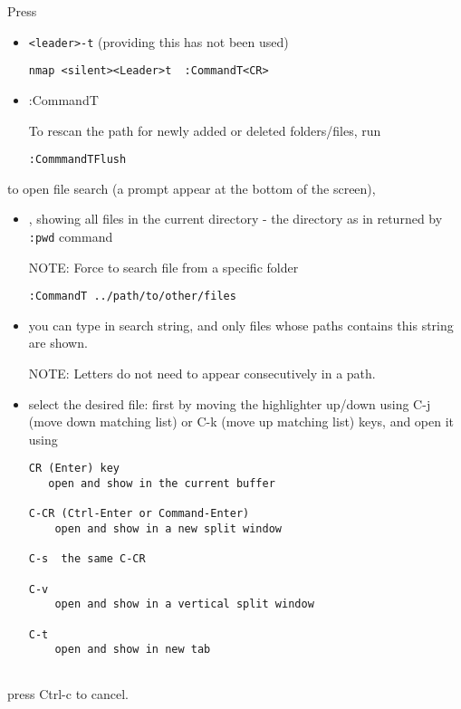 Press 
\begin{itemize}
  \item  \verb!<leader>-t!  (providing this has not been used)
  
\begin{verbatim}
nmap <silent><Leader>t  :CommandT<CR>
\end{verbatim}

  \item :CommandT
  
To rescan the path for newly added or deleted folders/files, run
\begin{verbatim}
:CommmandTFlush
\end{verbatim}

\end{itemize}
to open file search (a prompt appear at the bottom of the screen), 
\begin{itemize}
  \item , showing all files in the current directory -  the directory as in returned by \verb!:pwd! command

NOTE: Force to search file from a specific folder
\begin{verbatim}
:CommandT ../path/to/other/files
\end{verbatim}

  \item you can type in search string, and only files whose paths contains this string are shown.
  
NOTE: Letters do not need to appear consecutively in a path.

  \item select the desired file: first by moving the highlighter up/down using C-j (move down matching list) or
  C-k (move up matching list) keys, and open it using 
  
  \begin{verbatim}
CR (Enter) key
   open and show in the current buffer
   
C-CR (Ctrl-Enter or Command-Enter) 
    open and show in a new split window
    
C-s  the same C-CR

C-v   
    open and show in a vertical split window

C-t
    open and show in new tab
  
  \end{verbatim}
  
  
\end{itemize}

press Ctrl-c to cancel.

